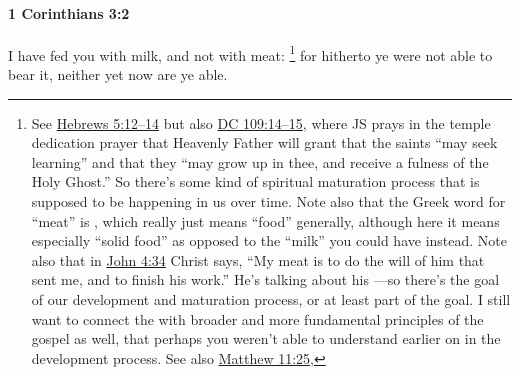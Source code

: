 			\begin{framed}
			\scriptsize
				\begin{compactdesc}
					\item[SBLG] 
				\end{compactdesc}
			\end{framed}

		\paragraph{1 Corinthians 3:2} %
			\label{1CORINTHIANS-3-2}

			I have fed you with milk, and not with meat:%
				\footnote{%
					See \hyperref[HEBREWS-5-12]{Hebrews 5:12--14} but also \hyperref[DC109-14]{DC 109:14--15}, where JS prays in the temple dedication prayer that Heavenly Father will grant that the saints ``may seek learning'' and that they ``may grow up in thee, and receive a fulness of the Holy Ghost.'' So there's some kind of spiritual maturation process that is supposed to be happening in us over time. Note also that the Greek word for ``meat'' is , which really just means ``food'' generally, although here it means especially ``solid food'' as opposed to the ``milk'' you could have instead. Note also that in \hyperref[JOHN-4-34]{John 4:34} Christ says, ``My meat is to do the will of him that sent me, and to finish his work.'' He's talking about his ---so there's the goal of our development and maturation process, or at least part of the goal. I still want to connect the  with broader and more fundamental principles of the gospel as well, that perhaps you weren't able to understand earlier on in the development process. See also \hyperref[MATTHEW-11-25]{Matthew 11:25},
					}
			for hitherto ye were not able to bear it, neither yet now are ye able.

